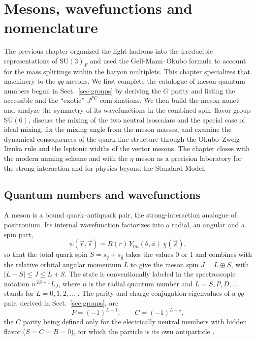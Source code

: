 \section{Mesons, wavefunctions and nomenclature}
\label{sec:mesons}

The previous chapter organized the light hadrons into the irreducible
representations of $\mathrm{SU(3)}_{F}$ and used the Gell-Mann--Okubo formula to
account for the mass splittings within the baryon multiplets. This chapter
specializes that machinery to the $q\bar q$ mesons. We first complete the catalogue
of meson quantum numbers begun in Sect.~\ref{sec:groups} by deriving the $G$ parity
and listing the accessible and the ``exotic'' $J^{PC}$ combinations. We then build
the meson nonet and analyze the symmetry of its wavefunctions in the combined
spin--flavor group $\mathrm{SU}(6)$, discuss the mixing of the two neutral
isoscalars and the special case of ideal mixing, fix the mixing angle from the meson
masses, and examine the dynamical consequences of the quark-line structure through
the Okubo--Zweig--Iizuka rule and the leptonic widths of the vector mesons. The
chapter closes with the modern naming scheme and with the $\eta$ meson as a precision
laboratory for the strong interaction and for physics beyond the Standard Model.

\subsection{Quantum numbers and wavefunctions}
\label{subsec:qnumbers}

A meson is a bound quark--antiquark pair, the strong-interaction analogue of
positronium. Its internal wavefunction factorizes into a radial, an angular and a
spin part,
\begin{equation}
    \psi(\vec r,\vec s) = R(r)\,Y_{lm}(\theta,\phi)\,\chi(\vec s),
    \label{eq:meson_wavefunction}
\end{equation}
so that the total quark spin $S = s_q + s_{\bar q}$ takes the values $0$ or $1$ and
combines with the relative orbital angular momentum $L$ to give the meson spin
$J = L \oplus S$, with $|L-S| \le J \le L+S$. The state is conventionally labeled in
the spectroscopic notation $n^{\,2S+1}L_J$, where $n$ is the radial quantum number
and $L = S, P, D, \dots$ stands for $L = 0, 1, 2, \dots$
\cite[Ch.~2]{Amsler2018}. The parity and charge-conjugation eigenvalues of a
$q\bar q$ pair, derived in Sect.~\ref{sec:groups}, are
\begin{equation}
    P = (-1)^{L+1},
    \qquad
    C = (-1)^{L+s},
    \label{eq:meson_PC}
\end{equation}
the $C$ parity being defined only for the electrically neutral members with hidden
flavor ($S = C = B = 0$), for which the particle is its own antiparticle
\cite[Ch.~3]{Amsler2018}.


